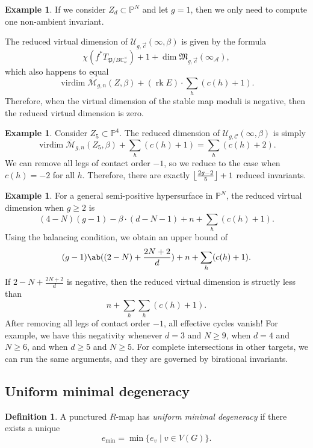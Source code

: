 \documentclass[10pt,oldfontcommands,oneside]{memoir}
\DeclarePairedDelimiter{\floor}{\lfloor}{\rfloor}
\theoremstyle{definition}
\newtheorem{defn}[thm]{Definition}
\newtheorem{exm}[thm]{Example}
\theoremstyle{remark}
\theoremstyle{plain}
\theoremstyle{definition}
\theoremstyle{remark}
\newcommand{\C}{\mathbb{C}}
\renewcommand{\P}{\mathbb{P}}
\newcommand{\Mbar}{\overline{\mathcal{M}}}
\newcommand{\mc}[1]{\mathcal{#1}}
\newcommand{\mf}[1]{\mathfrak{#1}}
\newcommand{\on}[1]{\operatorname{#1}}
\newcommand{\1}{\mathbf{1}}
\newcommand{\2}{\mathbf{2}}
\newcommand{\3}{\mathbf{3}}
\begin{document}
\begin{exm}
    If we consider $Z_d \subset \P^N$ and let $g=1$, then we only need to compute one non-ambient invariant.
\end{exm}

The reduced virtual dimension of $\mc{U}_{g, \vec{c}}(\infty,\beta)$ is given by the formula
\[ \chi(f^* T_{\mf{P}/B \C_{\omega}^{\times}}) + 1 + \dim \mf{M}_{g,\vec{c}}(\infty_{\mc{A}}), \]
which also happens to equal
\[ \on{virdim} \Mbar_{g,n}(Z,\beta) + (\on{rk} E) \cdot \sum_h (c(h)+1). \]
Therefore, when the virtual dimension of the stable map moduli is negative, then the reduced virtual dimension is zero.

\begin{exm}
    Consider $Z_5 \subset \P^4$. The reduced dimension of $\mc{U}_{g,\mc{C}}(\infty, \beta)$ is simply
    \[ \on{virdim} \Mbar_{g,n}(Z_5, \beta) + \sum_h (c(h)+1) = \sum_h (c(h)+2). \]
    We can remove all legs of contact order $-1$, so we reduce to the case when $c(h) = -2$ for all $h$. Therefore, there are exactly $\floor*{ \frac{2g-2}{5} }+ 1$ reduced invariants. 
\end{exm}

\begin{exm}
    For a general semi-positive hypersurface in $\P^N$, the reduced virtual dimension when $g \geq 2$ is
    \[ (4-N)(g-1) - \beta \cdot (d-N-1) + n + \sum_h (c(h)+1). \]
    Using the balancing condition, we obtain an upper bound of
    \[ (g-1) \ab((2-N) + \frac{2N+2}{d}) + n + \sum_h (c(h)+1). \]
    If $2-N + \frac{2N+2}{d}$ is negative, then the reduced virtual dimension is structly less than
    \[ n + \sum_h \sum_h (c(h)+1). \]
    After removing all legs of contact order $-1$, all effective cycles vanish! For example, we have this negativity whenever $d=3$ and $N \geq 9$, when $d=4$ and $N \geq 6$, and when $d \geq 5$ and $N \geq 5$. For complete intersections in other targets, we can run the same arguments, and they are governed by birational invariants.
\end{exm}

\subsection{Uniform minimal degeneracy}%
\label{sub:Uniform minimal degeneracy}

\begin{defn}
    A punctured $R$-map has \textit{uniform minimal degeneracy} if there exists a unique
    \[ e_{\min} = \min \{ e_v \mid v \in V(G) \}. \]
\end{defn}
\end{document}
